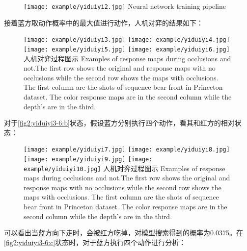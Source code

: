\begin{figure}[!hbtp]
	\centering
	\texttt{[image: example/yiduiyi2.jpg]}
	{Neural network training pipeline}
	\label{yiduiyi2.jpg}
\end{figure}

接着蓝方取动作概率中的最大值进行动作，人机对弈的结果如下：
\begin{figure}[!htp]
	\centering
	{\texttt{[image: example/yiduiyi3.jpg]}}
	\hspace{0.5em}
	{\texttt{[image: example/yiduiyi4.jpg]}}
	\newline
	\centering
	{\texttt{[image: example/yiduiyi5.jpg]}}
	\hspace{0.5em}
	{\texttt{[image: example/yiduiyi6.jpg]}}
	\bicaption
	{人机对弈过程图示}
	{Examples of response maps during occlusions and not.The first row shows the original and response maps with no occlusions while the second row shows the maps with occlusions. The first column are the shots of sequence bear front in Princeton dataset. The color response maps are in the second column while the depth’s are in the third.}
	\label{fig2:yiduiyi3-6}
\end{figure}

对于\ref{fig2:yiduiyi3-6:b}状态，假设蓝方分别执行四个动作，看其和红方的相对状态：
\begin{figure}[!htp]
	\centering
	{\texttt{[image: example/yiduiyi7.jpg]}}
	\hspace{0.5em}
	{\texttt{[image: example/yiduiyi8.jpg]}}
	\newline
	\centering
	{\texttt{[image: example/yiduiyi9.jpg]}}
	\hspace{0.5em}
	{\texttt{[image: example/yiduiyi10.jpg]}}
	\bicaption
	{人机对弈过程图示}
	{Examples of response maps during occlusions and not.The first row shows the original and response maps with no occlusions while the second row shows the maps with occlusions. The first column are the shots of sequence bear front in Princeton dataset. The color response maps are in the second column while the depth’s are in the third.}
	\label{fig2:yiduiyi7-10}
\end{figure}
可以看出当蓝方向下走时，会被红方吃掉，对模型搜索得到的概率为0.0375。在\ref{fig2:yiduiyi3-6:c}状态时，对于蓝方执行四个动作进行分析：


